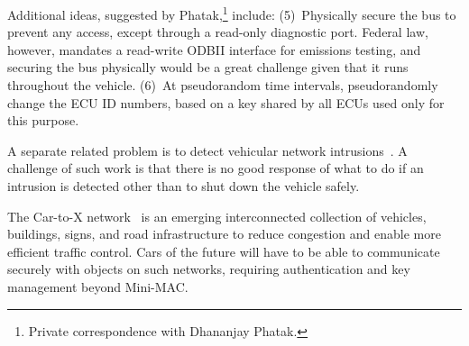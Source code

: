 
Additional ideas, suggested by Phatak,\footnote{Private correspondence with Dhananjay Phatak.} 
include:
(5)~Physically secure the bus to prevent any access, except through
a read-only diagnostic port.  Federal law, however, mandates a read-write ODBII interface
for emissions testing, and securing the bus physically would be a great challenge
given that it runs throughout the vehicle.
(6)~At pseudorandom time intervals, pseudorandomly change the ECU ID numbers, 
based on a key shared by all ECUs used only for this purpose.

A separate related problem is to detect vehicular network intrusions~\cite{Otsuka2014}. A challenge of such work is that
there is no good response of what to do if an intrusion is detected other than to shut down the vehicle safely.

The Car-to-X network~\cite{C2X} is an emerging interconnected collection of vehicles, buildings, signs, and road infrastructure 
to reduce congestion and enable more efficient traffic control. Cars of the future will have to be able to communicate
securely with objects on such networks, requiring authentication and key management beyond Mini-MAC.

